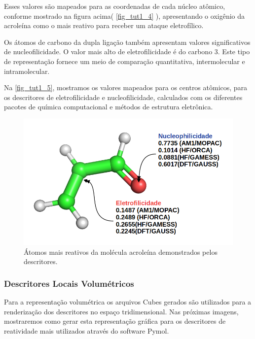 \documentclass[a4paper,11pt]{refart}
\begin{document}
Esses valores são mapeados para as coordenadas de cada núcleo atômico, conforme mostrado na figura acima( \autoref{fig_tut1_4} ), apresentando o oxigênio da acroleína como o mais reativo para receber um ataque eletrofílico.

Os átomos de carbono da dupla ligação também apresentam valores significativos de nucleofilicidade. O valor mais alto de eletrofilicidade é do carbono 3. Este tipo de representação fornece um meio de comparação quantitativa, intermolecular e intramolecular. 

Na \autoref{fig_tut1_5}, mostramos os valores mapeados para os centros atômicos, para os descritores de eletrofilicidade e nucleofilicidade, calculados com os diferentes pacotes de química computacional e métodos de estrutura eletrônica. 

\hspace*{-\leftmarginwidth}
\begin{minipage}{\fullwidth}
\begin{figure}[H]
\begin{center}
\includegraphics[width=4.5in]{images/img6}
\caption{Átomos mais reativos da molécula acroleína demonstrados pelos descritores.}
\label{fig_tut1_5}
\end{center}
\end{figure}
\end{minipage}


\subsubsection{Descritores Locais Volumétricos}

Para a representação volumétrica os arquivos Cubes gerados são utilizados para a renderização dos descritores no espaço tridimensional. Nas próximas imagens, mostraremos como gerar esta representação gráfica para os descritores de reatividade mais utilizados através do software Pymol. 
\end{document}
